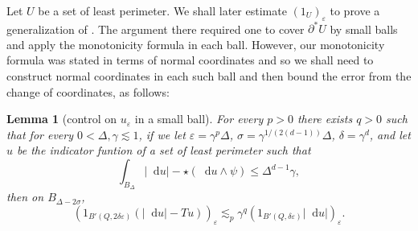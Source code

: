 \documentclass[reqno,12pt,letterpaper]{amsart}
\newcommand*\dif{\mathop{}\!\mathrm{d}}
\newtheorem{lemma}[theorem]{Lemma}
\theoremstyle{definition}
\numberwithin{equation}{section}
\begin{document}
Let $U$ be a set of least perimeter. We shall later estimate $(1_U)_\varepsilon$ to prove a generalization of \cite[Theorem 7.3]{Giusti77}.
The argument there required one to cover $\partial^* U$ by small balls and apply the monotonicity formula in each ball.
However, our monotonicity formula was stated in terms of normal coordinates and so we shall need to construct normal coordinates in each such ball and then bound the error from the change of coordinates, as follows:

\begin{lemma}[control on $u_\varepsilon$ in a small ball]\label{mollifier sublemma}
For every $p > 0$ there exists $q > 0$ such that for every $0 < \Delta, \gamma \lesssim 1$, if we let $\varepsilon = \gamma^p \Delta$, $\sigma = \gamma^{1/(2(d - 1))} \Delta$, $\delta = \gamma^d$, and let $u$ be the indicator funtion of a set of least perimeter such that
\begin{equation}\label{hypothesis on mollifier sublemma}
\int_{B_\Delta} |\dif u| - \star (\dif u \wedge \psi) \leq \Delta^{d - 1} \gamma,
\end{equation}
then on $B_{\Delta - 2\sigma}$,
$$(1_{B'(Q, 2\delta\varepsilon)}(|\dif u| - Tu))_\varepsilon \lesssim_p \gamma^q (1_{B'(Q, \delta\varepsilon)} |\dif u|)_\varepsilon.$$
\end{lemma}
\end{document}
